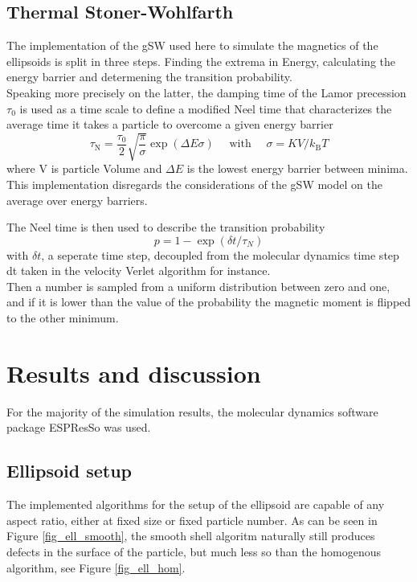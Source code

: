 \documentclass[12pt, DIV=12]{scrartcl}
\begin{document}
\subsection{Thermal Stoner-Wohlfarth}
The implementation of the gSW used here to simulate the magnetics of the ellipsoids \cite{Mostarac2025} is split in three steps. Finding the extrema in Energy, calculating the energy barrier and determening the transition probability.\\
Speaking more precisely on the latter, the damping time of the Lamor precession $\tau_0$ \cite{Poperechny2014} is used as a time scale to define a modified Neel time \cite{Brown1963} that characterizes the average time it takes a particle to overcome a given energy barrier
\begin{equation}
    \tau_\mathrm{N} = \frac{\tau_0}{2}  \sqrt{\frac{\pi}{\sigma}} \exp(\Delta E \sigma) \quad \text{ with } \quad  \sigma = KV/k_\mathrm{B}T
    \label{eqn_neel_time}
\end{equation}
where V is particle Volume and $\Delta E$ is the lowest energy barrier between minima. This implementation disregards the considerations of the gSW model on the average over energy barriers.

The Neel time is then used to describe the transition probability
\begin{equation}
    p = 1 - \exp(\delta t/\tau_N)
    \label{eqn_trans}
\end{equation}
with $\delta t$, a seperate time step, decoupled from the molecular dynamics time step dt taken in the velocity Verlet algorithm for instance.\\
Then a number is sampled from a uniform distribution between zero and one, and if it is lower than the value of the probability the magnetic moment is flipped to the other minimum.


\newpage
\section{Results and discussion}

For the majority of the simulation results, the molecular dynamics software package ESPResSo \cite{Weeber2024} \cite{Weik2019} \cite{Grad2026} was used.
\subsection{Ellipsoid setup}

The implemented algorithms for the setup of the ellipsoid are capable of any aspect ratio, either at fixed size or fixed particle number. As can be seen in Figure \ref{fig_ell_smooth}, the smooth shell algoritm naturally still produces defects in the surface of the particle, but much less so than the homogenous algorithm, see Figure \ref{fig_ell_hom}.
\end{document}
